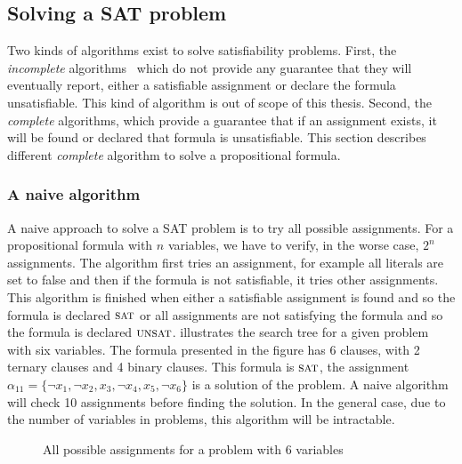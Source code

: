 \subsection{Solving a SAT problem}
Two kinds of algorithms exist to solve satisfiability problems.
First, the \emph{incomplete} algorithms~\cite{kautz2009incomplete} which do not provide any guarantee that they will eventually report,
either a satisfiable assignment or declare the formula unsatisfiable. This kind of algorithm is out of scope of this thesis. 
Second, the \emph{complete} algorithms, which provide a guarantee that if an assignment exists,
it will be found or declared that formula is unsatisfiable.
This section describes different \emph{complete} algorithm to solve a propositional formula.

\subsubsection{A naive algorithm}

A naive approach to solve a SAT problem is to try all possible assignments.
For a propositional formula with $n$ variables, we have to verify, in the worse case, $2^n$ assignments.  
The algorithm first tries an assignment, for example all literals are set to false and then if
the formula is not satisfiable, it tries other assignments. 
This algorithm is finished when either a satisfiable assignment is found and so
the formula is declared $\textsc{sat}$  or all assignments are not satisfying the formula and so the formula is declared $\textsc{unsat}$.
 illustrates the search tree for a given problem with six variables.
The  formula presented in the figure has 6 clauses, with 2 ternary clauses and 4 binary clauses.
This formula is $\textsc{sat}$, the assignment $\alpha_{11} = \{\neg x_1, \neg x_2, x_3, \neg x_4, x_5, \neg x_6 \}$ is a solution of the problem.
A naive algorithm will check 10 assignments before finding the solution. 
In the general case, due to the number of variables in problems, this algorithm will be intractable.
\begin{figure}[!htbp]
 \centering
 
 \caption{All possible assignments for a problem with 6 variables}
 \label{fig:naive_algo}
\end{figure}

